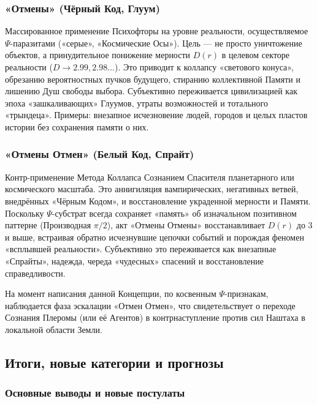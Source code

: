 \documentclass[a4paper,12pt]{article}
\begin{document}
\subsubsection{«Отмены» (Чёрный Код, Глуум)}

Массированное применение Психофторы на уровне реальности, осуществляемое $\Psi$-паразитами («серые», «Космические Осы»). Цель — не просто уничтожение объектов, а принудительное понижение мерности $D(r)$ в целевом секторе реальности ($D \to 2.99, 2.98\dots$). Это приводит к коллапсу «светового конуса», обрезанию вероятностных пучков будущего, стиранию коллективной Памяти и лишению Душ свободы выбора. Субъективно переживается цивилизацией как эпоха «зашкаливающих» Глуумов, утраты возможностей и тотального «трындеца». Примеры: внезапное исчезновение людей, городов и целых пластов истории без сохранения памяти о них.

\subsubsection{«Отмены Отмен» (Белый Код, Спрайт)}

Контр-применение Метода Коллапса Сознанием Спасителя планетарного или космического масштаба. Это аннигиляция вампирических, негативных ветвей, внедрённых «Чёрным Кодом», и восстановление украденной мерности и Памяти. Поскольку $\Psi$-субстрат всегда сохраняет «память» об изначальном позитивном паттерне (Производная $\pi/2$), акт «Отмены Отмены» восстанавливает $D(r)$ до 3 и выше, встраивая обратно исчезнувшие цепочки событий и порождая феномен «всплывшей реальности». Субъективно это переживается как внезапные «Спрайты», надежда, череда «чудесных» спасений и восстановление справедливости.

На момент написания данной Концепции, по косвенным $\Psi$-признакам, наблюдается фаза эскалации «Отмен Отмен», что свидетельствует о переходе Сознания Плеромы (или её Агентов) в контрнаступление против сил Наштаха в локальной области Земли.

\subsection{Итоги, новые категории и прогнозы}

\subsubsection{Основные выводы и новые постулаты}
\end{document}
